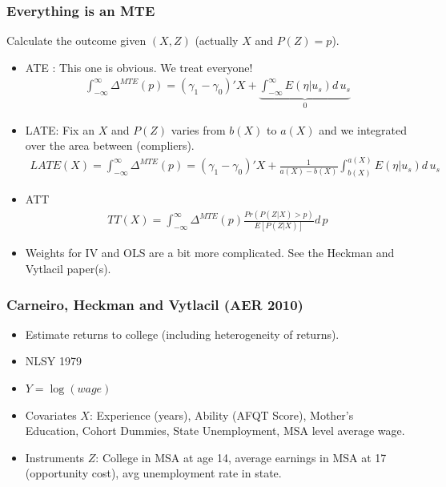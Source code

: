 \documentclass[xcolor=pdftex,dvipsnames,table,mathserif]{beamer}
\begin{document}
\begin{frame}
\footnotesize
\frametitle{Everything is an MTE}
Calculate the outcome given $(X,Z)$ (actually $X$ and $P(Z)=p$).
\begin{itemize}
\item ATE : This one is obvious. We treat everyone!
\begin{eqnarray*}
\int_{-\infty}^{\infty} \Delta^{MTE}(p) = (\gamma_1 - \gamma_0)'X + \underbrace{\int_{-\infty}^{\infty} E(\eta | u_s) d\, u_s}_{0}
\end{eqnarray*}
\item LATE: Fix an $X$ and $P(Z)$ varies from $b(X)$ to $a(X)$ and we integrated over the area between (compliers).
\begin{eqnarray*}
LATE(X)=\int_{-\infty}^{\infty} \Delta^{MTE}(p) =  (\gamma_1 - \gamma_0)'X + \frac{1}{a(X)-b(X)} \int_{b(X)}^{a(X)} E(\eta | u_s) d\, u_s
\end{eqnarray*}

\item ATT 
\begin{eqnarray*}
TT(X)=\int_{-\infty}^{\infty} \Delta^{MTE}(p) \frac{Pr(P(Z | X) > p)}{E[P(Z | X)]} d\,p
\end{eqnarray*}

\item Weights for IV and OLS are a bit more complicated. See the Heckman and Vytlacil paper(s).
\end{itemize}
\end{frame}

\begin{frame}
\frametitle{Carneiro, Heckman and Vytlacil (AER 2010)}
\begin{itemize}
\item Estimate returns to college (including heterogeneity of returns).
\item NLSY 1979
\item $Y = \log(wage)$
\item Covariates $X$: Experience (years), Ability (AFQT Score), Mother's Education, Cohort Dummies, State Unemployment, MSA level average wage.
\item Instruments $Z$: College in MSA at age 14, average earnings in MSA at 17 (opportunity cost), avg unemployment rate in state.
\end{itemize}
\end{frame}
\end{document}
